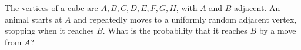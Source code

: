 The vertices of a cube are $A,B,C,D,E,F,G,H$, with $A$ and $B$ adjacent. An animal starts at $A$ and repeatedly moves to a uniformly random adjacent vertex, stopping when it reaches $B$. What is the probability that it reaches $B$ by a move from $A$?
